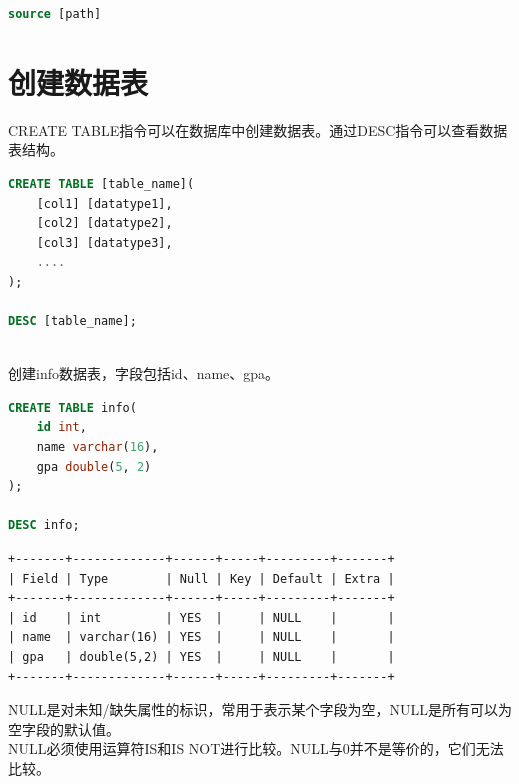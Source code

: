 \documentclass[12pt, openany, oneside]{book}
\begin{document}
\begin{lstlisting}[language=SQL]
source [path]
\end{lstlisting}

\section{创建数据表}

CREATE TABLE指令可以在数据库中创建数据表。通过DESC指令可以查看数据表结构。

\vspace{-0.5cm}

\begin{lstlisting}[language=SQL]
CREATE TABLE [table_name](
    [col1] [datatype1],
    [col2] [datatype2],
    [col3] [datatype3],
    ....
);

DESC [table_name];
\end{lstlisting}

\vspace{0.5cm}

 \\

创建info数据表，字段包括id、name、gpa。

\vspace{-0.5cm}

\begin{lstlisting}[language=SQL]
CREATE TABLE info(
    id int, 
    name varchar(16), 
    gpa double(5, 2)
);

DESC info;
\end{lstlisting}

\begin{tcolorbox}
    \begin{verbatim}
+-------+-------------+------+-----+---------+-------+
| Field | Type        | Null | Key | Default | Extra |
+-------+-------------+------+-----+---------+-------+
| id    | int         | YES  |     | NULL    |       |
| name  | varchar(16) | YES  |     | NULL    |       |
| gpa   | double(5,2) | YES  |     | NULL    |       |
+-------+-------------+------+-----+---------+-------+
	\end{verbatim}
\end{tcolorbox}

NULL是对未知/缺失属性的标识，常用于表示某个字段为空，NULL是所有可以为空字段的默认值。 \\

NULL必须使用运算符IS和IS NOT进行比较。NULL与0并不是等价的，它们无法比较。
\end{document}
